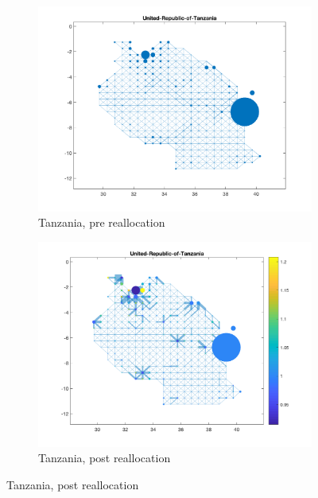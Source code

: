 \documentclass[11pt, oneside]{article}   	%
\begin{document}
\begin{figure}[!p]
\begin{subfigure}[c]{0.45\textwidth}
\includegraphics[width=\textwidth, trim={2cm 1cm 1.5cm 0cm},clip]{../../Build/output/Matlab_graphs/Nicer_graphs/United-Republic-of-Tanzania_stat.png}
\caption{Tanzania, pre reallocation}
\label{fig:tanzania_pre}
\end{subfigure}
\begin{subfigure}[c]{0.45\textwidth}
\includegraphics[width=\textwidth, trim={2cm 1cm 1.5cm 0cm},clip]{../../Build/output/Matlab_graphs/Nicer_graphs/United-Republic-of-Tanzania_opt.png}
\caption{Tanzania, post reallocation}
\label{fig:tanzania_post}
\end{subfigure}


\end{figure}
\end{document}
